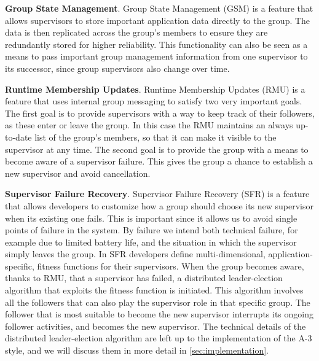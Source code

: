 \textbf{Group State Management}. Group State Management (GSM) is a feature that allows supervisors to store important application data directly to the group. The data is then replicated across the group's members to ensure they are redundantly stored for higher reliability. This functionality can also be seen as a means to pass important group management information from one supervisor to its successor, since group supervisors also change over time.

\textbf{Runtime Membership Updates}. Runtime Membership Updates (RMU) is a feature that uses internal group messaging to satisfy two very important goals. The first goal is to provide supervisors with a way to keep track of their followers, as these enter or leave the group. In this case the RMU maintains an always up-to-date list of the group's members, so that it can make it visible to the supervisor at any time. The second goal is to provide the group with a means to become aware of a supervisor failure. This gives the group a chance to establish a new supervisor and avoid cancellation. 

\textbf{Supervisor Failure Recovery}. Supervisor Failure Recovery (SFR) is a feature that allows developers to customize how a group should choose its new supervisor when its existing one fails. This is important since it allows us to avoid single points of failure in the system. By failure we intend both technical failure, for example due to limited battery life, and the situation in which the supervisor simply leaves the group. In SFR developers define multi-dimensional, application-specific, fitness functions for their supervisors. When the group becomes aware, thanks to RMU, that a supervisor has failed, a distributed leader-election algorithm that exploits the fitness function is initiated. This algorithm involves all the followers that can also play the supervisor role in that specific group. The follower that is most suitable to become the new supervisor interrupts its ongoing follower activities, and becomes the new supervisor. The technical details of the distributed leader-election algorithm are left up to the implementation of the A-3 style, and we will discuss them in more detail in \ref{sec:implementation}. 











